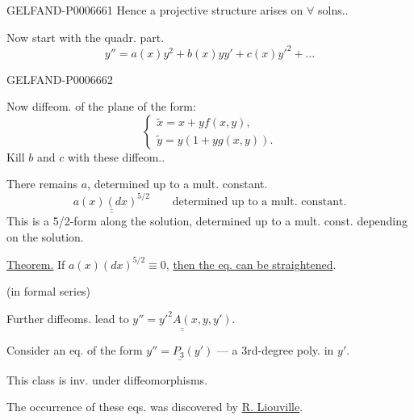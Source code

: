 \begin{GelfandAdjacentEvidence}{GELFAND-P000666}{1}
Hence a projective structure arises on \(\forall\) solns..

Now start with the quadr. part.
\[
y''=a(x)y^2+b(x)yy'+c(x)y'^2+\ldots
\]
\end{GelfandAdjacentEvidence}
\begin{GelfandAdjacentEvidence}{GELFAND-P000666}{2}


Now diffeom. of the plane of the form:
\[
\begin{cases}
\tilde x=x+yf(x,y),\\
\tilde y=y(1+yg(x,y)).
\end{cases}
\]
Kill \(b\) and \(c\) with these diffeom..

There remains \(a\), determined up to a mult. constant.
\[
\underline{\underline{a(x)(dx)^{5/2}}}\qquad\text{determined up to a mult. constant.}
\]
This is a 5/2-form along the solution, determined up to a mult. const. depending on the solution.

\underline{Theorem.} If \(a(x)(dx)^{5/2}\equiv0\), \underline{then the eq. can be straightened}.

(in formal series)

Further diffeoms. lead to \(\underline{\underline{y''=y'^2A(x,y,y')}}\).

Consider an eq. of the form \(\underline{y''=P_3(y')}\) --- a 3rd-degree poly. in \(y'\).

This class is inv. under diffeomorphisms.

The occurrence of these eqs. was discovered by \underline{R. Liouville}.
\end{GelfandAdjacentEvidence}
